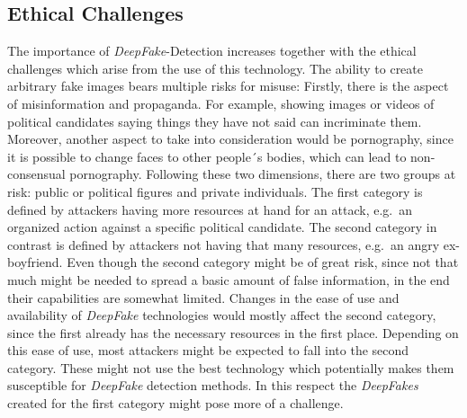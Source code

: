 \subsection{Ethical Challenges}
The importance of \textit{DeepFake}-Detection increases together with the ethical
challenges which arise from the use of this technology. The ability to create
arbitrary fake images bears multiple risks for misuse: Firstly, there is the
aspect of misinformation and propaganda. For example, showing images or videos
of political candidates saying things they have not said can incriminate
them. Moreover, another aspect to take into consideration would be pornography,
since it is possible to change faces to other people´s bodies, which can lead to
non-consensual pornography. Following these two dimensions, there are two groups
at risk: public or political figures and private individuals. The first category
is defined by attackers having more resources at hand for an attack, e.g.\ an
organized action against a specific political candidate. The second category in 
contrast is defined by attackers not having that many resources, e.g.\ an angry 
ex-boyfriend. Even though the second category might be of great risk, since not 
that much might be needed to spread a basic amount of false information, in the 
end their capabilities are somewhat limited. Changes in the ease of use and 
availability of \textit{DeepFake} technologies would mostly affect the second category, 
since the first already has the necessary resources in the first place. Depending 
on this ease of use, most attackers might be expected to fall into the second 
category. These might not use the best technology which potentially makes them 
susceptible for \textit{DeepFake} detection methods. In this respect the \textit{DeepFakes}
created for the first category might pose more of a challenge.
 